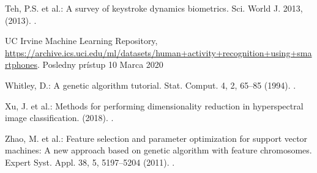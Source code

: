 \documentclass[runningheads]{llncs}
\begin{document}
\begin{thebibliography}{8}
Teh, P.S. et al.: A survey of keystroke dynamics biometrics. Sci. World J. 2013, (2013). .

UC Irvine Machine Learning Repository, \url{https://archive.ics.uci.edu/ml/datasets/human+activity+recognition+using+smartphones}. Posledny prístup 10 Marca 2020

Whitley, D.: A genetic algorithm tutorial. Stat. Comput. 4, 2, 65–85 (1994). .

Xu, J. et al.: Methods for performing dimensionality reduction in hyperspectral image classification. (2018). .

Zhao, M. et al.: Feature selection and parameter optimization for support vector machines: A new approach based on genetic algorithm with feature chromosomes. Expert Syst. Appl. 38, 5, 5197–5204 (2011). .

\end{thebibliography}
\end{document}
